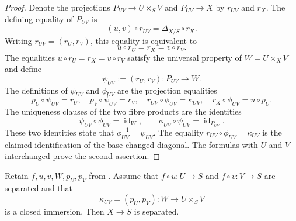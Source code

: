\begin{proof}
  Denote the projections $P_{UV}\to U\times_SV$ and $P_{UV}\to X$ by
  $r_{UV}$ and $r_X$.  The defining equality of $P_{UV}$ is
  \[
    (u,v)\circ r_{UV}=\Delta_{X/S}\circ r_X.
  \]
  Writing $r_{UV}=(r_U,r_V)$, this equality is equivalent to
  \[
    u\circ r_U=r_X=v\circ r_V.
  \]
  The equalities $u\circ r_U=r_X=v\circ r_V$ satisfy the universal property
  of $W=U\times_XV$ and define
  \[
    \psi_{UV}:=(r_U,r_V)\colon P_{UV}\longrightarrow W.
  \]
  The definitions of $\psi_{UV}$ and $\phi_{UV}$ are the projection
  equalities
  \[
    p_U\circ\psi_{UV}=r_U,
    \quad p_V\circ\psi_{UV}=r_V,
    \quad r_{UV}\circ\phi_{UV}=\kappa_{UV},
    \quad r_X\circ\phi_{UV}=u\circ p_U.
  \]
  The uniqueness clauses of the two fibre products are the identities
  \[
    \psi_{UV}\circ\phi_{UV}=\operatorname{id}_W,
    \qquad
    \phi_{UV}\circ\psi_{UV}=\operatorname{id}_{P_{UV}}.
  \]
  These two identities state that
  $\phi_{UV}^{-1}=\psi_{UV}$.  The equality
  $r_{UV}\circ\phi_{UV}=\kappa_{UV}$ is the claimed identification of the
  base-changed diagonal.
  The formulas with $U$ and $V$ interchanged prove the second assertion.
\end{proof}

\begin{lemma}
  \label{lemma:nagata-separated-two-open-cover}
  \lean{}

  Retain $f,u,v,W,p_U,p_V$ from
  .  Assume that
  $f\circ u\colon U\to S$ and $f\circ v\colon V\to S$ are separated and that
  \[
    \kappa_{UV}=(p_U,p_V)\colon W\longrightarrow U\times_SV
  \]
  is a closed immersion.  Then $X\to S$ is separated.
\end{lemma}

